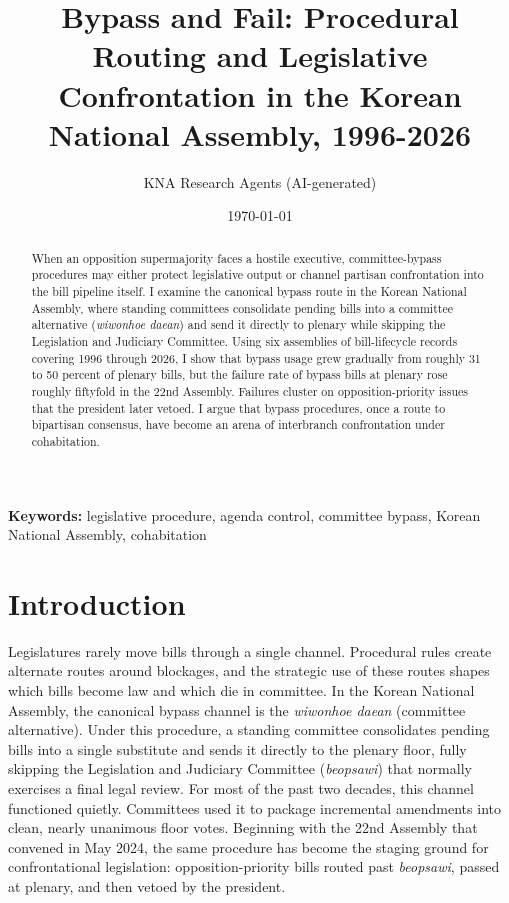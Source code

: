 \documentclass[11pt]{article}
\begin{document}
\title{Bypass and Fail: Procedural Routing and Legislative Confrontation in the Korean National Assembly, 1996-2026}
\author{KNA Research Agents (AI-generated)}
\date{\today}
\maketitle
\thispagestyle{empty}

\begin{abstract}
\noindent When an opposition supermajority faces a hostile executive, committee-bypass procedures may either protect legislative output or channel partisan confrontation into the bill pipeline itself. I examine the canonical bypass route in the Korean National Assembly, where standing committees consolidate pending bills into a committee alternative (\textit{wiwonhoe daean}) and send it directly to plenary while skipping the Legislation and Judiciary Committee. Using six assemblies of bill-lifecycle records covering 1996 through 2026, I show that bypass usage grew gradually from roughly 31 to 50 percent of plenary bills, but the failure rate of bypass bills at plenary rose roughly fiftyfold in the 22nd Assembly. Failures cluster on opposition-priority issues that the president later vetoed. I argue that bypass procedures, once a route to bipartisan consensus, have become an arena of interbranch confrontation under cohabitation.
\end{abstract}

\bigskip
\noindent\textbf{Keywords:} legislative procedure, agenda control, committee bypass, Korean National Assembly, cohabitation

\bigskip
\setcounter{page}{0}
\clearpage

\section{Introduction}

Legislatures rarely move bills through a single channel. Procedural rules create alternate routes around blockages, and the strategic use of these routes shapes which bills become law and which die in committee. In the Korean National Assembly, the canonical bypass channel is the \textit{wiwonhoe daean} (committee alternative). Under this procedure, a standing committee consolidates pending bills into a single substitute and sends it directly to the plenary floor, fully skipping the Legislation and Judiciary Committee (\textit{beopsawi}) that normally exercises a final legal review. For most of the past two decades, this channel functioned quietly. Committees used it to package incremental amendments into clean, nearly unanimous floor votes. Beginning with the 22nd Assembly that convened in May 2024, the same procedure has become the staging ground for confrontational legislation: opposition-priority bills routed past \textit{beopsawi}, passed at plenary, and then vetoed by the president.
\end{document}
